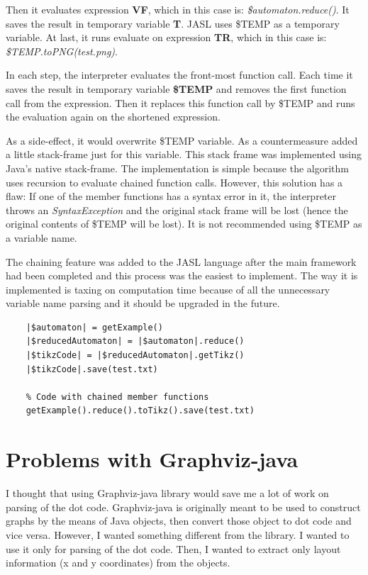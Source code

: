 \documentclass{ctuthesis}
\begin{document}
Then it evaluates expression \textbf{VF}, which in this case is: \textit{\$automaton.reduce()}. It saves the result in temporary variable \textbf{T}. 	
JASL uses \$TEMP as a temporary variable. At last, it runs evaluate on expression \textbf{TR}, which in this case is: \textit{\$TEMP.toPNG(test.png)}.

In each step, the interpreter evaluates the front-most function call. Each time it saves the result in temporary variable \textbf{\$TEMP} and removes the first function call from the expression. Then it replaces this function call by \$TEMP and runs the evaluation again on the shortened expression. 

As a side-effect, it would overwrite \$TEMP variable. As a countermeasure added a little stack-frame just for this variable. This stack frame was implemented using Java's native stack-frame. The implementation is simple because the algorithm uses recursion to evaluate chained function calls. However, this solution has a flaw: If one of the member functions has a syntax error in it, the interpreter throws an \textit{SyntaxException} and the original stack frame will be lost (hence the original contents of \$TEMP will be lost). It is not recommended using \$TEMP as a variable name. 

The chaining feature was added to the JASL language after the main framework had been completed and this process was the easiest to implement. The way it is implemented is taxing on computation time because of all the unnecessary variable name parsing and it should be upgraded in the future. 

\begin{minipage}{\linewidth}
\begin{lstlisting}[language = JASL]
	% Code without chained member function calls
	|$automaton| = getExample()
	|$reducedAutomaton| = |$automaton|.reduce()
	|$tikzCode| = |$reducedAutomaton|.getTikz()
	|$tikzCode|.save(test.txt)
	
	% Code with chained member functions
	getExample().reduce().toTikz().save(test.txt)
\end{lstlisting}
\end{minipage}

\section{Problems with Graphviz-java}
\label{subsec:graphviz-java-problems}
I thought that using Graphviz-java library would save me a lot of work on parsing of the dot code. Graphviz-java is originally meant to be used to construct graphs by the means of Java objects, then convert those object to dot code and vice versa. However, I wanted something different from the library. I wanted to use it only for parsing of the dot code. Then, I wanted to extract only layout information (x and y coordinates) from the objects. 
\end{document}
